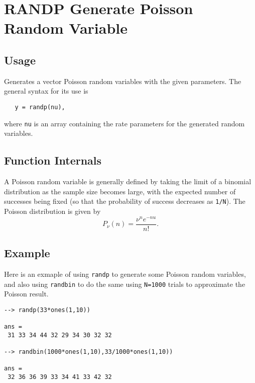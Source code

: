\section{RANDP Generate Poisson Random Variable}

\subsection{Usage}

Generates a vector Poisson random variables with the given
parameters.  The general syntax for its use is
\begin{verbatim}
   y = randp(nu),
\end{verbatim}
where \verb|nu| is an array containing the rate parameters
for the generated random variables.  
\subsection{Function Internals}

A Poisson random variable is generally defined by taking the
limit of a binomial distribution as the sample size becomes
large, with the expected number of successes being fixed (so
that the probability of success decreases as \verb|1/N|).  
The Poisson distribution is given by
\[
  P_{\nu}(n) = \frac{\nu^n e^{-nu}}{n!}.
\]
\subsection{Example}

Here is an exmaple of using \verb|randp| to generate some Poisson
random variables, and also using \verb|randbin| to do the same
using \verb|N=1000| trials to approximate the Poisson result.
\begin{verbatim}
--> randp(33*ones(1,10))

ans = 
 31 33 34 44 32 29 34 30 32 32 

--> randbin(1000*ones(1,10),33/1000*ones(1,10))

ans = 
 32 36 36 39 33 34 41 33 42 32 
\end{verbatim}
